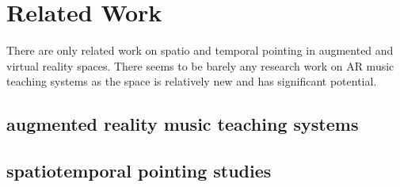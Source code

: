 \documentclass{article}
\begin{document}
\section{Related Work}
There are only related work on spatio and temporal pointing in augmented and virtual reality spaces. There seems to be barely any research work on AR music teaching systems as the space is relatively new and has significant potential.\\
\subsection{augmented reality music teaching systems }
\subsection{spatiotemporal pointing studies }
\end{document}
